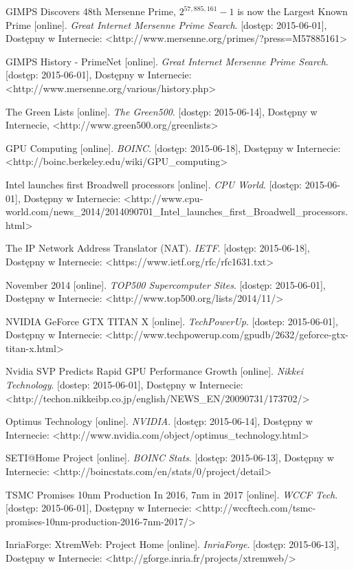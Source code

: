 \documentclass[12pt,a4paper,twoside]{article}
\begin{document}
\begin{thebibliography}{99}

 GIMPS Discovers 48th Mersenne Prime, $2^{57,885,161}-1$ is now the Largest Known Prime [online].\textit{ Great Internet Mersenne Prime Search}. [dostęp: 2015-06-01], Dostępny w Internecie: <http://www.mersenne.org/primes/?press=M57885161>

 GIMPS History - PrimeNet [online].\textit{ Great Internet Mersenne Prime Search}. [dostęp: 2015-06-01], Dostępny w Internecie: <http://www.mersenne.org/various/history.php>

 The Green Lists [online]. \textit{The Green500}. [dostęp: 2015-06-14], Dostępny w Internecie, <http://www.green500.org/greenlists>

 GPU Computing [online]. \textit{BOINC}. [dostęp: 2015-06-18], Dostępny w Internecie: <http://boinc.berkeley.edu/wiki/GPU\_computing>

 Intel launches first Broadwell processors [online]. \textit{CPU World}. [dostęp: 2015-06-01], Dostępny w Internecie: <http://www.cpu-world.com/news\_2014/2014090701\_Intel\_launches\_first\_Broadwell\_processors.html>

 The IP Network Address Translator (NAT). \textit{IETF}. [dostęp: 2015-06-18], Dostępny w Internecie: <https://www.ietf.org/rfc/rfc1631.txt>

 November 2014 [online]. \textit{TOP500 Supercomputer Sites}. [dostęp: 2015-06-01], Dostępny w Internecie: <http://www.top500.org/lists/2014/11/>

 NVIDIA GeForce GTX TITAN X [online]. \textit{TechPowerUp}. [dostep: 2015-06-01], Dostępny w Internecie: <http://www.techpowerup.com/gpudb/2632/geforce-gtx-titan-x.html>

 Nvidia SVP Predicts Rapid GPU Performance Growth [online]. \textit{Nikkei Technology}. [dostep: 2015-06-01], Dostępny w Internecie: <http://techon.nikkeibp.co.jp/english/NEWS\_EN/20090731/173702/>

 Optimus Technology [online]. \textit{NVIDIA}. [dostęp: 2015-06-14], Dostępny w Internecie: <http://www.nvidia.com/object/optimus\_technology.html>

 SETI@Home Project [online]. \textit{BOINC Stats}. [dostęp: 2015-06-13], Dostępny w Internecie: <http://boincstats.com/en/stats/0/project/detail>

 TSMC Promises 10nm Production In 2016, 7nm in 2017 [online]. \textit{WCCF Tech}. [dostęp: 2015-06-01], Dostępny w Internecie: <http://wccftech.com/tsmc-promises-10nm-production-2016-7nm-2017/>

 InriaForge: XtremWeb: Project Home [online]. \textit{InriaForge}. [dostęp: 2015-06-13], Dostępny w Internecie: <http://gforge.inria.fr/projects/xtremweb/>

\end{thebibliography}
\endgroup
\end{document}
